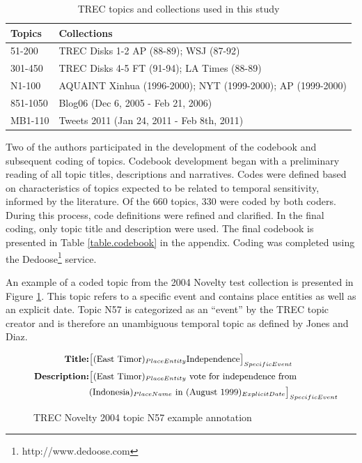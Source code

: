 \documentclass[runningheads,a4paper]{llncs}
\begin{document}
\begin{table}
\center
\small
\begin{tabular}{| l | l|} \hline
\bf{Topics} & \bf{Collections}\\ \hline
51-200 & TREC Disks 1-2 AP (88-89); WSJ (87-92) \\ \hline
301-450 &  TREC Disks 4-5 FT (91-94); LA Times (88-89) \\ \hline
N1-100 & AQUAINT Xinhua (1996-2000); NYT (1999-2000); AP (1999-2000) \\ \hline
851-1050 & Blog06  (Dec 6, 2005 - Feb 21, 2006) \\ \hline
MB1-110 & Tweets 2011 (Jan 24, 2011 - Feb 8th, 2011) \\ \hline
\end{tabular}
\caption{TREC topics and collections used in this study}
\label{table.topics}
\end{table}

Two of the authors participated in the development of the codebook and subsequent coding of topics. Codebook development began with a preliminary reading of all topic titles, descriptions and narratives. Codes were defined based on characteristics of topics expected to be related to temporal sensitivity, informed by the literature. Of the 660 topics, 330 were coded by both coders. During this process, code definitions were refined and clarified. In the final coding, only topic title and description were used. The final codebook is presented in Table \ref{table.codebook} in the appendix. Coding was completed using the Dedoose\footnote{http://www.dedoose.com} service.  

An example of a coded topic from the 2004 Novelty test collection is presented in Figure \ref{fig.example}.  This topic refers to a specific event and contains place entities as well as an explicit date.  Topic N57 is categorized as an ``event'' by the TREC topic creator and is therefore an unambiguous temporal topic as defined by Jones and Diaz.

\begin{figure}
\begin{equation*}
\small
\begin{split}
\mbox{\bf{Title}:} & \big[(\mbox{East Timor})_{PlaceEntity} \mbox{Independence}\big]_{SpecificEvent} \\
\mbox{\bf{Description}:} & \big[  (\mbox{East Timor})_{PlaceEntity} \mbox{ vote for independence from } \\
	& (\mbox{Indonesia})_{PlaceName} \mbox{ in } (\mbox{August 1999})_{ExplicitDate}\big]_{SpecificEvent}
\end{split}
\end{equation*}
\caption{TREC Novelty 2004 topic N57 example annotation}
\label{fig.example}
\end{figure}
\end{document}
